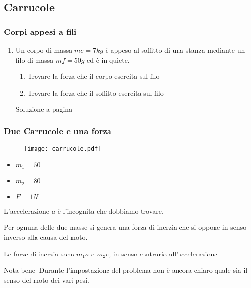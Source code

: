 \subsection{Carrucole} \label{carrucole}

\subsubsection{Corpi appesi a fili}

\begin{enumerate} %

\item %
\label{car_x_01}
Un corpo di massa $mc = 7 kg$ è appeso al soffitto di una stanza mediante un filo di massa
$mf = 50 g$ ed è in quiete.


\begin{enumerate}
\item Trovare la forza che il corpo esercita sul filo
\item Trovare la forza che il soffitto esercita sul filo
\end{enumerate}

Soluzione a pagina \pageref{car_s_01}


\end{enumerate} %



\subsubsection{Due Carrucole e una forza}

\begin{figure}[h]
\centering
\texttt{[image: carrucole.pdf]}
\end{figure}

\begin{itemize}
\item $m_1=50$
\item $m_2=80$
\item $F=1N$
\end{itemize}

L'accelerazione $a$ è l'incognita che dobbiamo trovare.

Per ognuna delle due masse si genera una forza di inerzia che si oppone in senso inverso alla causa del moto.

Le forze di inerzia sono $m_1a$ e $m_{2}a$, in senso contrario all'accelerazione.

Nota bene: Durante l'impostazione del problema non è ancora chiaro quale sia il senso del moto dei vari pesi.

